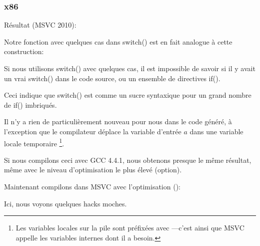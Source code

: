 \subsubsection{x86}


Résultat (MSVC 2010):



Notre fonction avec quelques cas dans switch() est en fait analogue à cette construction:




Si nous utilisons switch() avec quelques cas, il est impossible de savoir si il y
avait un vrai switch() dans le code source, ou un ensemble de directives if().
\myindex{\SyntacticSugar}

Ceci indique que switch() est comme un sucre syntaxique pour un grand nombre de if()
imbriqués.

Il n'y a rien de particulièrement nouveau pour nous dans le code généré, à l'exception
que le compilateur déplace la variable d'entrée $a$ dans une variable locale temporaire
 \footnote{Les variables locales sur la pile sont préfixées avec ---c'est
ainsi que MSVC appelle les variables internes dont il a besoin.}.

Si nous compilons ceci avec GCC 4.4.1, nous obtenons presque le même résultat,
même avec le niveau d'optimisation le plus élevé (\Othree option).


Maintenant compilons dans MSVC avec l'optimisation (\Ox): 

\label{JMP_instead_of_RET}


Ici, nous voyons quelques hacks moches.

